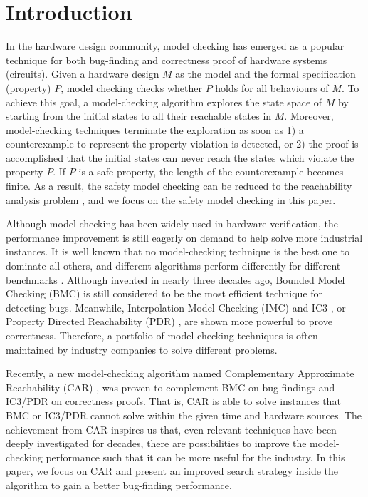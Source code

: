 \section{Introduction}
In the hardware design community, model checking \cite{CGD99} has emerged as a popular technique for both bug-finding and correctness proof of hardware systems (circuits). Given a hardware design $M$ as the model and the formal specification (property) $P$, model checking checks whether $P$ holds for all behaviours of $M$. To achieve this goal, a model-checking algorithm explores the state space of $M$ by starting from the initial states to all their reachable states in $M$. Moreover, model-checking techniques terminate the exploration as soon as 1) a counterexample to represent the property violation is detected, or 2) the proof is accomplished that the initial states can never reach the states which violate the property $P$. If $P$ is a safe property, the length of the counterexample becomes finite. As a result, the safety model checking can be reduced to the reachability analysis problem \cite{KV99c}, and we focus on the safety model checking in this paper.  


Although model checking has been widely used in hardware verification, the performance improvement is still eagerly on demand to help solve more industrial instances. It is well known that no model-checking technique is the best one to dominate all others, and different algorithms perform differently for different benchmarks \cite{GR16}. Although invented in nearly three decades ago, Bounded Model Checking (BMC) \cite{BCCFZ99,BCCZ99} is still considered to be the most efficient technique for detecting bugs.  Meanwhile,  Interpolation Model Checking (IMC) \cite{McM03} and IC3 \cite{Bra11}, or Property Directed Reachability  (PDR) \cite{EMB11}, are shown more powerful to prove correctness. Therefore, a portfolio of model checking techniques is often maintained by industry companies to solve different problems.

Recently, a new model-checking algorithm named Complementary Approximate Reachability (CAR) \cite{LZZPV17}, was proven to complement BMC on bug-findings and IC3/PDR on correctness proofs. That is, CAR is able to solve instances that BMC or IC3/PDR cannot solve within the given time and hardware sources. The achievement from CAR inspires us that, even relevant techniques have been deeply investigated for decades, there are possibilities to improve the model-checking performance such that it can be more useful for the industry. In this paper, we focus on CAR and present an improved search strategy inside the algorithm to gain a better bug-finding performance.  


